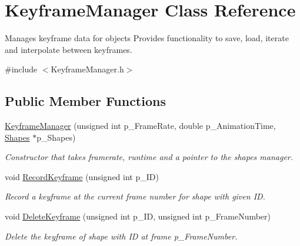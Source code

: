 \hypertarget{class_keyframe_manager}{}\section{Keyframe\+Manager Class Reference}
\label{class_keyframe_manager}


Manages keyframe data for objects Provides functionality to save, load, iterate and interpolate between keyframes.  




{\ttfamily \#include $<$Keyframe\+Manager.\+h$>$}

\subsection*{Public Member Functions}
\begin{DoxyCompactItemize}
\item 
\mbox{\label{class_keyframe_manager_aeb89db344dcdca1c212b8e9f8d75a024}} 
\hyperlink{class_keyframe_manager_aeb89db344dcdca1c212b8e9f8d75a024}{Keyframe\+Manager} (unsigned int p\+\_\+\+Frame\+Rate, double p\+\_\+\+Animation\+Time, \hyperlink{class_shapes}{Shapes} $\ast$p\+\_\+\+Shapes)
\begin{DoxyCompactList}\small\item\em Constructor that takes framerate, runtime and a pointer to the shapes manager. \end{DoxyCompactList}\item 
\mbox{\label{class_keyframe_manager_a53c98866dce1a595c6e289e028234e99}} 
void \hyperlink{class_keyframe_manager_a53c98866dce1a595c6e289e028234e99}{Record\+Keyframe} (unsigned int p\+\_\+\+ID)
\begin{DoxyCompactList}\small\item\em Record a keyframe at the current frame number for shape with given ID. \end{DoxyCompactList}\item 
\mbox{\label{class_keyframe_manager_acfa120e0e5ea6df1724c4191bf32c503}} 
void \hyperlink{class_keyframe_manager_acfa120e0e5ea6df1724c4191bf32c503}{Delete\+Keyframe} (unsigned int p\+\_\+\+ID, unsigned int p\+\_\+\+Frame\+Number)
\begin{DoxyCompactList}\small\item\em Delete the keyframe of shape with ID at frame p\+\_\+\+Frame\+Number. \end{DoxyCompactList}\item 

\end{DoxyCompactItemize}

